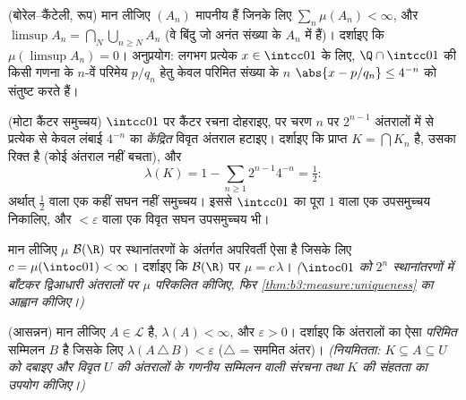 \begin{exercise}[$\star\star$]\label{exo:b3:measure:4}
(बोरेल--कैंटेली,  रूप) मान लीजिए $(A_n)$ मापनीय हैं जिनके लिए
$\sum_n\mu(A_n) < \infty$, और $\limsup A_n =
\bigcap_N\bigcup_{n\geq N}A_n$ (वे बिंदु जो अनंत संख्या के $A_n$ में हैं)।
दर्शाइए कि $\mu(\limsup A_n) = 0$। अनुप्रयोग: लगभग प्रत्येक $x \in \intcc01$ के लिए, $\Q\cap\intcc01$
की किसी गणना के $n$-वें परिमेय $p/q_n$ हेतु केवल परिमित संख्या
के $n$ $\abs{x - p/q_n} \leq 4^{-n}$ को संतुष्ट करते हैं।
\end{exercise}

\begin{exercise}[$\star\star$]\label{exo:b3:measure:5}
(मोटा कैंटर समुच्चय) $\intcc01$ पर कैंटर रचना दोहराइए, पर चरण $n$ पर
$2^{n-1}$ अंतरालों में से प्रत्येक से केवल लंबाई $4^{-n}$ का
\emph{केंद्रित} विवृत अंतराल हटाइए। दर्शाइए कि प्राप्त $K = \bigcap K_n$ 
है, उसका  रिक्त है (कोई अंतराल नहीं बचता), और
\[
\lambda(K) = 1 - \sum_{n\geq1}2^{n-1}4^{-n} = \tfrac12 :
\]
अर्थात्  $\frac12$ वाला एक कहीं सघन नहीं समुच्चय। इससे $\intcc01$ का
पूरा  $1$ वाला एक \emph{} उपसमुच्चय निकालिए, और 
$< \varepsilon$ वाला एक विवृत सघन उपसमुच्चय भी।
\end{exercise}

\begin{exercise}[$\star\star$]\label{exo:b3:measure:6}
मान लीजिए $\mu$ $\mathcal B(\R)$ पर स्थानांतरणों के अंतर्गत अपरिवर्ती ऐसा
 है जिसके लिए $c = \mu(\intoc01) < \infty$। दर्शाइए कि $\mathcal B(\R)$ पर $\mu =
c\,\lambda$। \emph{($\intoc01$
को $2^n$ स्थानांतरणों में बाँटकर द्विआधारी अंतरालों पर $\mu$
परिकलित कीजिए, फिर \cref{thm:b3:measure:uniqueness} का आह्वान कीजिए।)}
\end{exercise}

\begin{exercise}[$\star\star$]\label{exo:b3:measure:7}
(आसन्नन) मान लीजिए $A \in \mathcal L$ है, $\lambda(A) <
\infty$, और $\varepsilon > 0$। दर्शाइए कि
अंतरालों का ऐसा \emph{परिमित} सम्मिलन $B$ है जिसके लिए $\lambda(A\,\triangle\,B) <
\varepsilon$
($\triangle$ = सममित अंतर)। \emph{(नियमितता: $K \subseteq A \subseteq U$ को दबाइए और विवृत
$U$ की अंतरालों के गणनीय सम्मिलन वाली संरचना तथा $K$ की
संहतता का उपयोग कीजिए।)}
\end{exercise}

